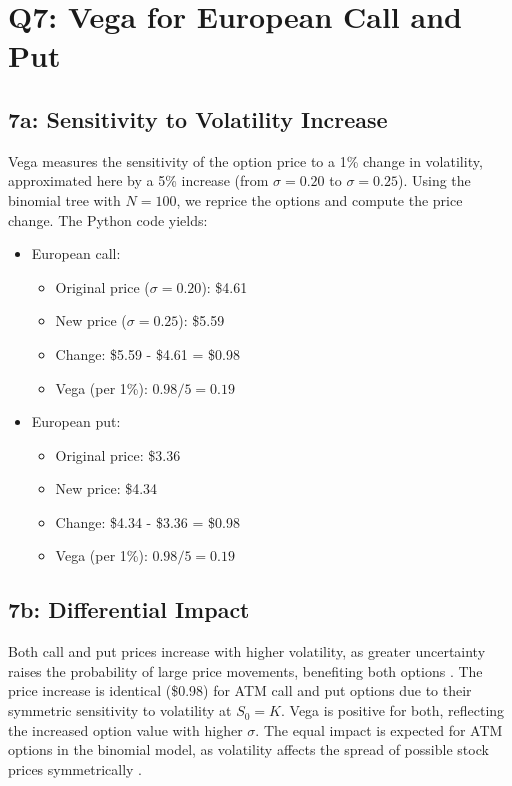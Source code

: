 \documentclass{article}
\begin{document}
\section*{Q7: Vega for European Call and Put}

\subsection*{7a: Sensitivity to Volatility Increase}

Vega measures the sensitivity of the option price to a 1\% change in volatility, approximated here by a 5\% increase (from $\sigma = 0.20$ to $\sigma = 0.25$). Using the binomial tree with $N = 100$, we reprice the options and compute the price change. The Python code yields:

\begin{itemize}
    \item European call:
    \begin{itemize}
        \item Original price ($\sigma = 0.20$): \$4.61
        \item New price ($\sigma = 0.25$): \$5.59
        \item Change: \$5.59 - \$4.61 = \$0.98
        \item Vega (per 1\%): $0.98 / 5 = 0.19$
    \end{itemize}
    \item European put:
    \begin{itemize}
        \item Original price: \$3.36
        \item New price: \$4.34
        \item Change: \$4.34 - \$3.36 = \$0.98
        \item Vega (per 1\%): $0.98 / 5 = 0.19$
    \end{itemize}
\end{itemize}

\subsection*{7b: Differential Impact}

Both call and put prices increase with higher volatility, as greater uncertainty raises the probability of large price movements, benefiting both options \citep{hull2018options}. The price increase is identical (\$0.98) for ATM call and put options due to their symmetric sensitivity to volatility at $S_0 = K$. Vega is positive for both, reflecting the increased option value with higher $\sigma$. The equal impact is expected for ATM options in the binomial model, as volatility affects the spread of possible stock prices symmetrically \citep{shreve2004stochastic}.
\end{document}
